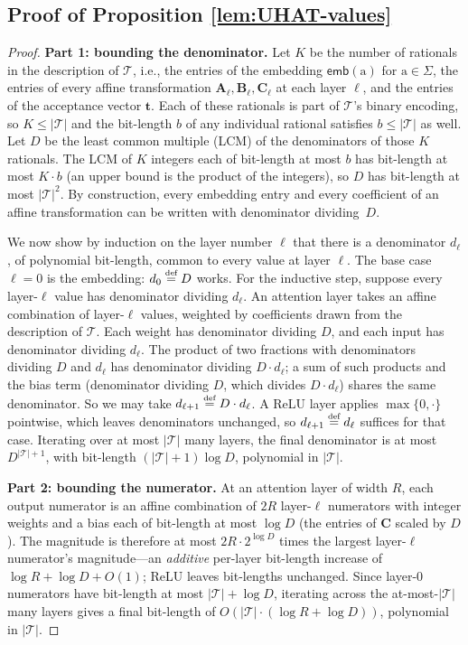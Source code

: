 \documentclass{article} %
\newcommand{\emb}{\mathsf{emb}}
\newcommand{\defeq}{\mathrel{\stackrel{\textnormal{\tiny def}}{=}}}
\newcommand{\matA}{\boldsymbol{A}}
\newcommand{\matB}{\boldsymbol{B}}
\newcommand{\matC}{\boldsymbol{C}}
\newcommand{\sym}[1]{\mathrm{#1}}
\newcommand{\alphabet}{\Sigma}
\newcommand{\trans}{\mathcal{T}}
\newcommand{\bt}{\boldsymbol{t}}
\begin{document}
\subsection{Proof of Proposition \ref{lem:UHAT-values}}\label{app:UHAT-values}
\propUHATvalues*
\begin{proof}
\medskip\noindent\textbf{Part 1: bounding the denominator.}\quad
Let $K$ be the number of rationals in the description of $\trans$, i.e., the entries of the embedding $\emb(\sym{a})$ for $\sym{a} \in \alphabet$, the entries of every affine transformation $\matA_\ell, \matB_\ell, \matC_\ell$ at each layer $\ell$, and the entries of the acceptance vector $\bt$. Each of these rationals is part of $\trans$'s binary encoding, so $K \le |\trans|$ and the bit-length $b$ of any individual rational satisfies $b \le |\trans|$ as well.
Let $D$ be the least common multiple (LCM) of the denominators of those $K$ rationals.
The LCM of $K$ integers each of bit-length at most $b$ has bit-length at most $K \cdot b$ (an upper bound is the product of the integers), so $D$ has bit-length at most $|\trans|^2$. By construction, every embedding entry and every coefficient of an affine transformation can be written with denominator dividing~$D$.

We now show by induction on the layer number $\ell$ that there is a denominator $d_\ell$, of polynomial bit-length, common to every value at layer $\ell$. The base case $\ell = 0$ is the embedding: $d_0 \defeq D$ works.
For the inductive step, suppose every layer-$\ell$ value has denominator dividing $d_\ell$. An attention layer takes an affine combination of layer-$\ell$ values, weighted by coefficients drawn from the description of $\trans$. Each weight has denominator dividing $D$, and each input has denominator dividing $d_\ell$. The product of two fractions with denominators dividing $D$ and $d_\ell$ has denominator dividing $D \cdot d_\ell$; a sum of such products and the bias term (denominator dividing $D$, which divides $D \cdot d_\ell$) shares the same denominator. So we may take $d_{\ell+1} \defeq D \cdot d_\ell$. A ReLU layer applies $\max\{0, \cdot\}$ pointwise, which leaves denominators unchanged, so $d_{\ell+1} \defeq d_\ell$ suffices for that case. Iterating over at most $|\trans|$ many layers, the final denominator is at most $D^{|\trans|+1}$, with bit-length $(|\trans|+1) \log D$, polynomial in $|\trans|$.

\medskip\noindent \textbf{Part 2: bounding the numerator.}\quad
At an attention layer of width $R$, each output numerator is an affine combination of $2R$ layer-$\ell$ numerators with integer weights and a bias each of bit-length at most $\log D$ (the entries of $\matC$ scaled by $D$). The magnitude is therefore at most $2R \cdot 2^{\log D}$ times the largest layer-$\ell$ numerator's magnitude---an \emph{additive} per-layer bit-length increase of $\log R + \log D + O(1)$; ReLU leaves bit-lengths unchanged. Since layer-$0$ numerators have bit-length at most $|\trans| + \log D$, iterating across the at-most-$|\trans|$ many layers gives a final bit-length of $O(|\trans| \cdot (\log R + \log D))$, polynomial in $|\trans|$.


\end{proof}
\end{document}
